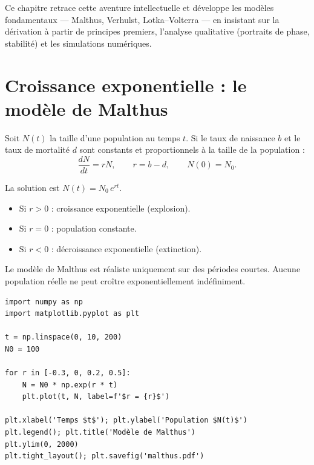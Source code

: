 Ce chapitre retrace cette aventure intellectuelle et d\'eveloppe les
mod\`eles fondamentaux --- Malthus, Verhulst, Lotka--Volterra --- en
insistant sur la d\'erivation \`a partir de principes premiers,
l'analyse qualitative (portraits de phase, stabilit\'e) et les
simulations num\'eriques.

\section{Croissance exponentielle : le mod\`ele de Malthus}
\label{sec:malthus}

\begin{definition}
Soit $N(t)$ la taille d'une population au temps $t$.  Si le taux
de naissance $b$ et le taux de mortalit\'e $d$ sont constants et
proportionnels \`a la taille de la population :
\[
  \frac{dN}{dt} = rN, \qquad r = b - d, \qquad N(0) = N_0.
\]
\end{definition}

\begin{theoreme}
La solution est $N(t) = N_0\,e^{rt}$.
\begin{itemize}
  \item Si $r > 0$ : croissance exponentielle (explosion).
  \item Si $r = 0$ : population constante.
  \item Si $r < 0$ : d\'ecroissance exponentielle (extinction).
\end{itemize}
\end{theoreme}

\begin{remarque}
Le mod\`ele de Malthus est r\'ealiste uniquement sur des p\'eriodes
courtes.  Aucune population r\'eelle ne peut cro\^itre
exponentiellement ind\'efiniment.
\end{remarque}

\begin{codeblock}[title=\textbf{Mod\`ele de Malthus en Python}]
\begin{verbatim}
import numpy as np
import matplotlib.pyplot as plt

t = np.linspace(0, 10, 200)
N0 = 100

for r in [-0.3, 0, 0.2, 0.5]:
    N = N0 * np.exp(r * t)
    plt.plot(t, N, label=f'$r = {r}$')

plt.xlabel('Temps $t$'); plt.ylabel('Population $N(t)$')
plt.legend(); plt.title('Modèle de Malthus')
plt.ylim(0, 2000)
plt.tight_layout(); plt.savefig('malthus.pdf')
\end{verbatim}
\end{codeblock}

